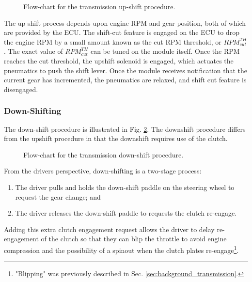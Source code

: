 \begin{figure}[H]
	\centering
	
	\caption{Flow-chart for the transmission up-shift procedure.}
	\label{fig:transmission_upshift_flow}
\end{figure}

The up-shift process depends upon engine RPM and gear position, both of which are provided by the ECU. The shift-cut feature is engaged on the ECU to drop the engine RPM by a small amount known as the cut RPM threshold, or $RPM^{TH}_{cut}$. The exact value of $RPM^{TH}_{cut}$ can be tuned on the module itself. Once the RPM reaches the cut threshold, the upshift solenoid is engaged, which actuates the pneumatics to push the shift lever. Once the module receives notification that the current gear has incremented, the pneumatics are relaxed, and shift cut feature is disengaged.


\subsubsection{Down-Shifting}

The down-shift procedure is illustrated in Fig. \ref{fig:transmission_downshift_flow}. The downshift procedure differs from the upshift procedure in that the downshift requires use of the clutch. 

\begin{figure}[H]
	\centering
	
	\caption{Flow-chart for the transmission down-shift procedure.}
	\label{fig:transmission_downshift_flow}
\end{figure}

From the drivers perspective, down-shifting is a two-stage process:

\begin{enumerate}
  \item The driver pulls and holds the down-shift paddle on the steering wheel to request the gear change; and
  \item The driver releases the down-shift paddle to requests the clutch re-engage.
\end{enumerate}

Adding this extra clutch engagement request allows the driver to delay re-engagement of the clutch so that they can blip the throttle to avoid engine compression and the possibility of a spinout when the clutch plates re-engage\footnote{"Blipping" was previously described in Sec. \ref{sec:background_transmission}.}. 


